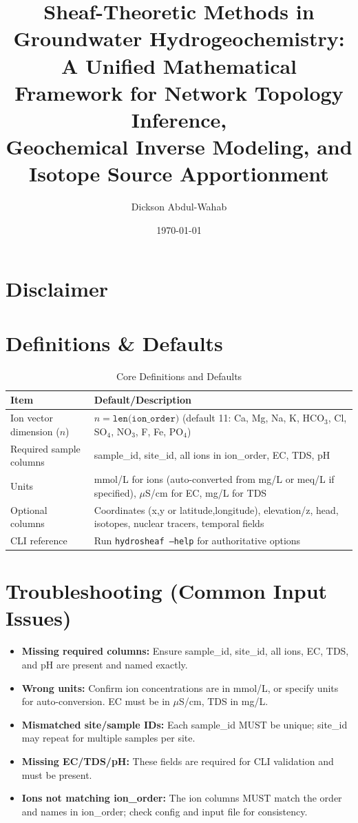 \documentclass[12pt,a4paper]{article}
\title{Sheaf-Theoretic Methods in Groundwater Hydrogeochemistry: \\
A Unified Mathematical Framework for Network Topology Inference, \\ Geochemical Inverse Modeling, and Isotope Source Apportionment}
\author{Dickson Abdul-Wahab}
\date{\today}
\theoremstyle{plain}
\theoremstyle{definition}
\theoremstyle{remark}
\begin{document}
\maketitle

\section*{Disclaimer}

\section*{Definitions \& Defaults}
\begin{table}[htbp]
\caption{Core Definitions and Defaults}
\begin{tabularx}{\textwidth}{@{} l X @{}}
\toprule
Item & Default/Description \\
\midrule
Ion vector dimension ($n$) & $n = \texttt{len(ion\_order)}$ (default 11: Ca, Mg, Na, K, HCO$_3$, Cl, SO$_4$, NO$_3$, F, Fe, PO$_4$) \\
Required sample columns & sample\_id, site\_id, all ions in ion\_order, EC, TDS, pH \\
Units & mmol/L for ions (auto-converted from mg/L or meq/L if specified), $\mu$S/cm for EC, mg/L for TDS \\
Optional columns & Coordinates (x,y or latitude,longitude), elevation/z, head, isotopes, nuclear tracers, temporal fields \\
CLI reference & Run \texttt{hydrosheaf --help} for authoritative options \\
\bottomrule
\end{tabularx}
\end{table}

\section*{Troubleshooting (Common Input Issues)}
\begin{itemize}
	\item \textbf{Missing required columns:} Ensure sample\_id, site\_id, all ions, EC, TDS, and pH are present and named exactly.
	\item \textbf{Wrong units:} Confirm ion concentrations are in mmol/L, or specify units for auto-conversion. EC must be in $\mu$S/cm, TDS in mg/L.
	\item \textbf{Mismatched site/sample IDs:} Each sample\_id MUST be unique; site\_id may repeat for multiple samples per site.
	\item \textbf{Missing EC/TDS/pH:} These fields are required for CLI validation and must be present.
	\item \textbf{Ions not matching ion\_order:} The ion columns MUST match the order and names in ion\_order; check config and input file for consistency.
\end{itemize}
\end{document}
